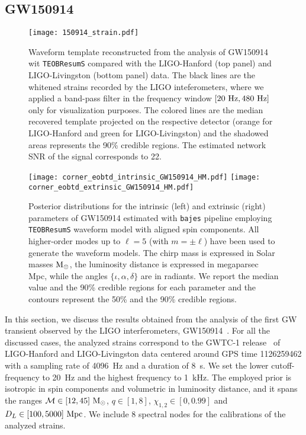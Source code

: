 \documentclass[prd,aps,twocolumn,a4paper,showkeys,nofootinbib,floatfix]{revtex4-1}
\def\M{\mathcal{M}}
\def\Mo{{\rm M_{\odot}}}
\newcommand{\bajes}{{\tt bajes}}
\begin{document}
\subsection{GW150914} 
\label{sec:GW150914}

\begin{figure}[t]
	\centering 
	\texttt{[image: 150914\_strain.pdf]}
	\caption{Waveform template reconstructed from the analysis of GW150914 wit {\tt TEOBResumS}
					compared with the LIGO-Hanford (top panel) and LIGO-Livingston (bottom panel) data.
					The black lines are the whitened strains recorded by the LIGO inteferometers,
					where we applied a band-pass filter in the frequency window $[20~{\rm Hz}, 480~{\rm Hz}]$ only for 
					visualization purposes.
					The colored lines are the median recovered template
					projected on the respective detector
					(orange for LIGO-Hanford and green for LIGO-Livingston)
					and the shadowed areas represents the 90\% credible regions.
					The estimated network SNR of the signal corresponds to 22. }
	\label{fig:150914_strain}
\end{figure}

\begin{figure*}[t]
	\centering 
	\texttt{[image: corner\_eobtd\_intrinsic\_GW150914\_HM.pdf]}
	\texttt{[image: corner\_eobtd\_extrinsic\_GW150914\_HM.pdf]}
	\caption{Posterior distributions
		for the intrinsic (left) and extrinsic (right) 
		parameters of GW150914 estimated with
		{\bajes} pipeline employing {\tt TEOBResumS} waveform model
		with aligned spin components.
		All higher-order modes up to $\ell=5$ (with $m=\pm \ell$)
		have been used to generate the waveform models.
		The chirp mass is expressed in Solar masses $\Mo$,
		the luminosity distance is expressed in megaparsec Mpc,
		while the angles $\{\iota, \alpha, \delta\}$ are in radiants.
		We report the median value and the 90\% credible regions for each parameter and the contours represent the 50\% and the 90\% credible regions.}
	\label{fig:150914_teob}
\end{figure*}

In this section, we discuss the results obtained 
from the analysis of the first GW transient observed by 
the LIGO interferometers, GW150914~\cite{Abbott:2016blz,TheLIGOScientific:2016htt,TheLIGOScientific:2016wfe, TheLIGOScientific:2016src}.
For all the discussed cases, the analyzed strains 
correspond to the GWTC-1 release~\cite{LIGOScientific:2018mvr} of LIGO-Hanford and 
LIGO-Livingston data centered around GPS time  1126259462
with a sampling rate of 4096~Hz and a duration of 8~s.
We set the lower cutoff-frequency to 20~Hz and the highest frequency to 1~kHz.
The employed prior is isotropic in spin components 
and volumetric in luminosity distance, and it
spans the ranges $\M\in[12,45]~\Mo$,
$q\in[1,8]$, $\chi_{1,2}\in [0,0.99]$ and $D_L\in [100,5000]~{\rm Mpc}$.
We include 8 spectral nodes for the calibrations of the analyzed strains.
\end{document}
